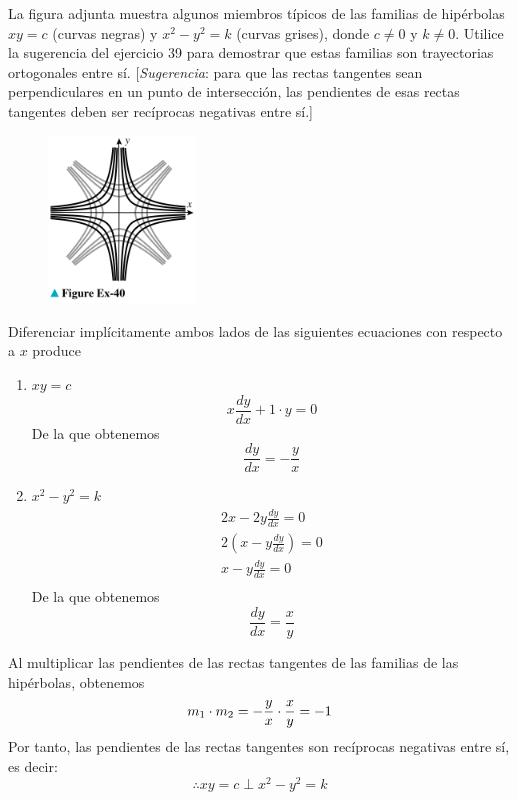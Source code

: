 \documentclass[12pt]{article}
\begin{document}
La figura adjunta muestra algunos miembros típicos de las familias de hipérbolas $xy=c$ (curvas negras) y $x^2-y^2=k$ (curvas grises), donde $c \neq 0$ y $k \neq 0$. Utilice la sugerencia del ejercicio 39 para demostrar que estas familias son trayectorias ortogonales entre sí. [\textit{Sugerencia}: para que las rectas tangentes sean perpendiculares en un punto de intersección, las pendientes de esas rectas tangentes deben ser recíprocas negativas entre sí.]
\begin{figure}[H]
\centering
\includegraphics[width=0.35\textwidth]{../img/img_Lista2/3_40.png}
\end{figure}
Diferenciar implícitamente ambos lados de las siguientes ecuaciones con respecto a $x$ produce
\begin{enumerate}
\item $xy=c$
  \[ x\frac{dy}{dx}+1\cdot y=0 \]
  De la que obtenemos
  \begin{equation} \label{eqn: d_c_negras}
    \frac{dy}{dx}=-\frac{y}{x}
  \end{equation}
\item $x^2-y^2=k$
  \begin{align*} 
    2x - 2y\frac{dy}{dx}=0\\
    2(x-y\frac{dy}{dx})=0\\
    x-y\frac{dy}{dx}=0\\
  \end{align*}
  De la que obtenemos
  \begin{equation} \label{eqn: d_c_grises}
    \frac{dy}{dx}=\frac{x}{y}
  \end{equation}
\end{enumerate}
Al multiplicar las pendientes de las rectas tangentes de las familias de las hipérbolas, obtenemos\\
\[
  m_1 \cdot m_2 = -\frac{y}{x}\cdot \frac{x}{y}=-1\\
  \]
Por tanto, las pendientes de las rectas tangentes son recíprocas negativas entre sí, es decir:
  \[\therefore xy=c \perp x^2-y^2=k\]
\end{document}
